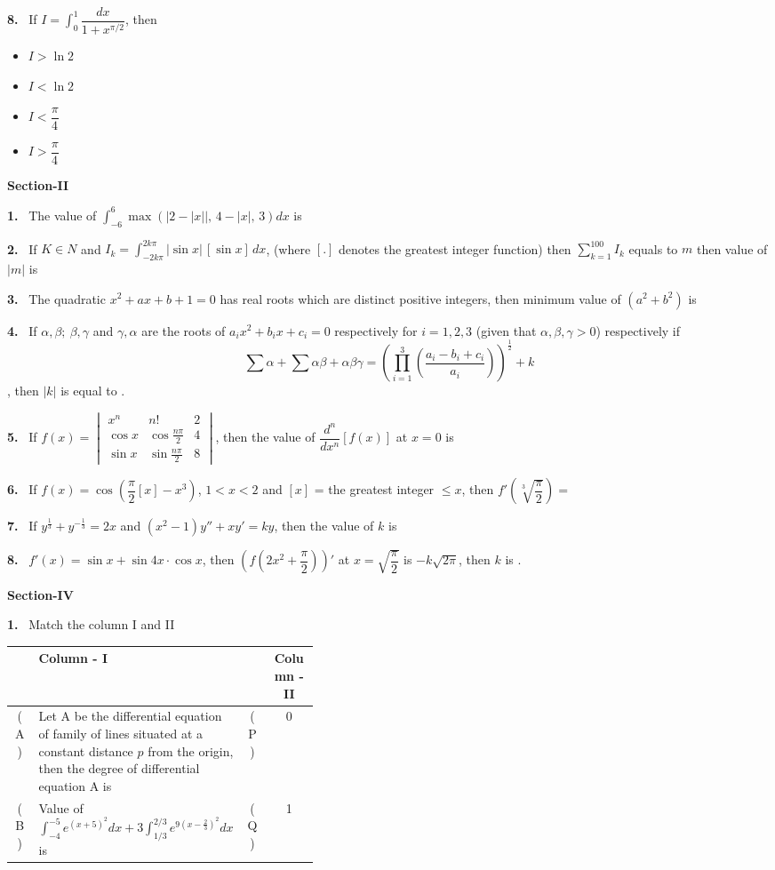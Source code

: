 \documentclass[10pt]{extarticle}
\newcommand{\sect}[1]{\par\smallskip\noindent\textbf{#1}\par}
\newcommand{\qn}[1]{\par\smallskip\noindent\textbf{#1.}~}
\newenvironment{qoptions}{\begin{itemize}[leftmargin=1.8em,itemsep=1pt,topsep=2pt,label={}]}{\end{itemize}}
\newcommand{\opt}[2]{\item[(#1)] #2}
\begin{document}
\begin{multicols}{2}
\qn{8} If $I=\displaystyle\int_0^1\dfrac{dx}{1+x^{\pi/2}}$, then
\begin{qoptions}
\opt{A}{$I>\ln2$}
\opt{B}{$I<\ln2$}
\opt{C}{$I<\dfrac\pi4$}
\opt{D}{$I>\dfrac\pi4$}
\end{qoptions}
\sect{Section-II}
\qn{1} The value of $\displaystyle\int_{-6}^{6}\max\left(\left|2-|x|\right|,\,4-|x|,\,3\right)dx$ is
\qn{2} If $K\in N$ and $I_k=\displaystyle\int_{-2k\pi}^{2k\pi}|\sin x|\,[\sin x]\,dx$, (where $[.]$ denotes the greatest integer function) then $\displaystyle\sum_{k=1}^{100}I_k$ equals to $m$ then value of $|m|$ is
\qn{3} The quadratic $x^2+ax+b+1=0$ has real roots which are distinct positive integers, then minimum value of $\left(a^2+b^2\right)$ is
\qn{4} If $\alpha,\beta;\ \beta,\gamma$ and $\gamma,\alpha$ are the roots of $a_ix^2+b_ix+c_i=0$ respectively for $i=1,2,3$ (given that $\alpha,\beta,\gamma>0$) respectively if
\[\sum\alpha+\sum\alpha\beta+\alpha\beta\gamma=\left(\prod_{i=1}^{3}\left(\frac{a_i-b_i+c_i}{a_i}\right)\right)^{\frac12}+k\]
, then $|k|$ is equal to \underline{\hspace{1cm}}.
\qn{5} If $f(x)=\begin{vmatrix}x^n&n!&2\\\cos x&\cos\frac{n\pi}2&4\\\sin x&\sin\frac{n\pi}2&8\end{vmatrix}$, then the value of $\dfrac{d^n}{dx^n}[f(x)]$ at $x=0$ is
\qn{6} If $f(x)=\cos\left(\dfrac\pi2[x]-x^3\right)$, $1<x<2$ and $[x]$ = the greatest integer $\leqslant x$, then $f'\left(\sqrt[3]{\dfrac\pi2}\right)=$
\qn{7} If $y^{\frac13}+y^{-\frac13}=2x$ and $\left(x^2-1\right)y''+xy'=ky$, then the value of $k$ is
\qn{8} $f'(x)=\sin x+\sin4x\cdot\cos x$, then $\left(f\left(2x^2+\dfrac\pi2\right)\right)'$ at $x=\sqrt{\dfrac\pi2}$ is $-k\sqrt{2\pi}$, then $k$ is \underline{\hspace{1cm}}.
\sect{Section-IV}
\qn{1} Match the column I and II
\begin{center}\small\renewcommand{\arraystretch}{1.5}\setlength\tabcolsep{3pt}
\begin{tabular}{|c|p{0.40\linewidth}|c|c|}\hline
 & \centering\textbf{Column - I} & & \textbf{Column - II}\\\hline
(A) & Let A be the differential equation of family of lines situated at a constant distance $p$ from the origin, then the degree of differential equation A is & (P) & 0\\\hline
(B) & Value of $\displaystyle\int_{-4}^{-5}e^{(x+5)^2}dx+3\int_{1/3}^{2/3}e^{9\left(x-\frac23\right)^2}dx$ is & (Q) & 1\\\hline

\end{tabular}
\end{center}
\end{multicols}
\end{document}
